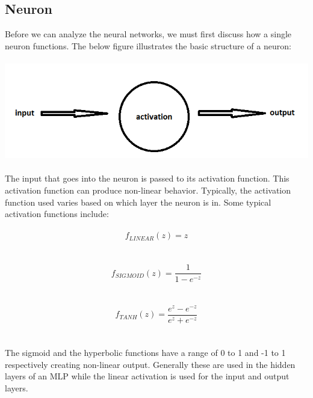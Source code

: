 \documentclass[paper=a4, fontsize=11pt]{scrartcl} %
\numberwithin{equation}{section} %
\numberwithin{figure}{section} %
\numberwithin{table}{section} %
\begin{document}
	\subsection{Neuron}
	Before we can analyze the neural networks, we must first discuss how a single neuron functions. The below figure illustrates the basic structure of a neuron:
	\\\\
	\includegraphics[scale=0.7]{neuron}
	\\\\
	The input that goes into the neuron is passed to its activation function. This activation function can produce non-linear behavior. Typically, the activation function used varies based on which layer the neuron is in. Some typical activation functions include:\\\\
	$$f_{LINEAR}(z) = z$$\\\\
	$$f_{SIGMOID}(z) = \frac{1}{1-e^{-z}}$$\\\\
	$$f_{TANH}(z) = \frac{e^z-e^{-z}}{e^z+e^{-z}}$$\\\\
	The sigmoid and the hyperbolic functions have a range of 0 to 1 and -1 to 1 respectively creating non-linear output. Generally these are used in the hidden layers of an MLP while the linear activation is used for the input and output layers.
	\\\\
\end{document}
